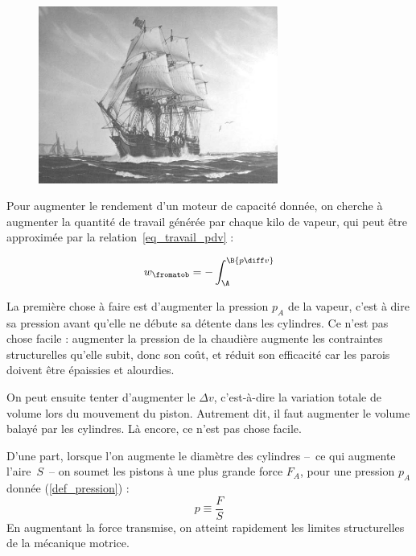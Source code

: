 	\begin{figure}
		\begin{center}
			\includegraphics[width=0.7\textwidth]{images/ss_savannah.jpg}
		\end{center}
		\onlyamphibook{\vspace{-2.5em}}%
	\end{figure}

	Pour augmenter le rendement d’un moteur de capacité donnée, on cherche à augmenter la quantité de travail générée par chaque kilo de vapeur, qui peut être approximée par la relation~\ref{eq_travail_pdv} :

	\begin{equation*}
	w_\fromatob = - \int _{\A}^\B {p \diff v}
	\end{equation*}

	La première chose à faire est d’augmenter la pression $p_A$ de la vapeur, c’est à dire sa pression avant qu’elle ne débute sa détente dans les cylindres. Ce n’est pas chose facile : augmenter la pression de la chaudière augmente les contraintes structurelles qu’elle subit, donc son coût, et réduit son efficacité car les parois doivent être épaissies et alourdies.

	On peut ensuite tenter d’augmenter le $\Delta v $, c’est-à-dire la variation totale de volume lors du mouvement du piston. Autrement dit, il faut augmenter le volume balayé par les cylindres. Là encore, ce n’est pas chose facile.
	
	D’une part, lorsque l’on augmente le diamètre des cylindres --\ ce qui augmente l’aire~$S$\ -- on soumet les pistons à une plus grande force $F_A$, pour une pression $p_A$ donnée (\ref{def_pression}) :
	\begin{equation*}
	p \equiv \frac{F}{S}
	\end{equation*}
	En augmentant la force transmise, on atteint rapidement les limites structurelles de la mécanique motrice.

